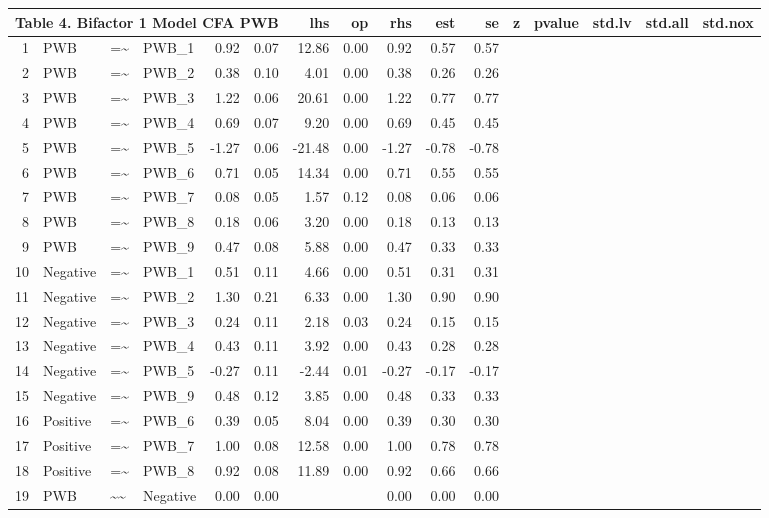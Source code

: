 \documentclass{article}
\begin{document}
\begin{table}[ht]
\centering
\begin{tabular}{rlllrrrrrrr}
 \multicolumn{ 6 }{l}{ Table 4. Bifactor 1 Model CFA PWB} \cr 
  \hline
 & lhs & op & rhs & est & se & z & pvalue & std.lv & std.all & std.nox \\ 
  \hline
1 & PWB & =\~{} & PWB\_1 & 0.92 & 0.07 & 12.86 & 0.00 & 0.92 & 0.57 & 0.57 \\ 
  2 & PWB & =\~{} & PWB\_2 & 0.38 & 0.10 & 4.01 & 0.00 & 0.38 & 0.26 & 0.26 \\ 
  3 & PWB & =\~{} & PWB\_3 & 1.22 & 0.06 & 20.61 & 0.00 & 1.22 & 0.77 & 0.77 \\ 
  4 & PWB & =\~{} & PWB\_4 & 0.69 & 0.07 & 9.20 & 0.00 & 0.69 & 0.45 & 0.45 \\ 
  5 & PWB & =\~{} & PWB\_5 & -1.27 & 0.06 & -21.48 & 0.00 & -1.27 & -0.78 & -0.78 \\ 
  6 & PWB & =\~{} & PWB\_6 & 0.71 & 0.05 & 14.34 & 0.00 & 0.71 & 0.55 & 0.55 \\ 
  7 & PWB & =\~{} & PWB\_7 & 0.08 & 0.05 & 1.57 & 0.12 & 0.08 & 0.06 & 0.06 \\ 
  8 & PWB & =\~{} & PWB\_8 & 0.18 & 0.06 & 3.20 & 0.00 & 0.18 & 0.13 & 0.13 \\ 
  9 & PWB & =\~{} & PWB\_9 & 0.47 & 0.08 & 5.88 & 0.00 & 0.47 & 0.33 & 0.33 \\ 
  10 & Negative & =\~{} & PWB\_1 & 0.51 & 0.11 & 4.66 & 0.00 & 0.51 & 0.31 & 0.31 \\ 
  11 & Negative & =\~{} & PWB\_2 & 1.30 & 0.21 & 6.33 & 0.00 & 1.30 & 0.90 & 0.90 \\ 
  12 & Negative & =\~{} & PWB\_3 & 0.24 & 0.11 & 2.18 & 0.03 & 0.24 & 0.15 & 0.15 \\ 
  13 & Negative & =\~{} & PWB\_4 & 0.43 & 0.11 & 3.92 & 0.00 & 0.43 & 0.28 & 0.28 \\ 
  14 & Negative & =\~{} & PWB\_5 & -0.27 & 0.11 & -2.44 & 0.01 & -0.27 & -0.17 & -0.17 \\ 
  15 & Negative & =\~{} & PWB\_9 & 0.48 & 0.12 & 3.85 & 0.00 & 0.48 & 0.33 & 0.33 \\ 
  16 & Positive & =\~{} & PWB\_6 & 0.39 & 0.05 & 8.04 & 0.00 & 0.39 & 0.30 & 0.30 \\ 
  17 & Positive & =\~{} & PWB\_7 & 1.00 & 0.08 & 12.58 & 0.00 & 1.00 & 0.78 & 0.78 \\ 
  18 & Positive & =\~{} & PWB\_8 & 0.92 & 0.08 & 11.89 & 0.00 & 0.92 & 0.66 & 0.66 \\ 
  19 & PWB & \~{}\~{} & Negative & 0.00 & 0.00 &  &  & 0.00 & 0.00 & 0.00 \\ 

\end{tabular}
\end{table}
\end{document}
